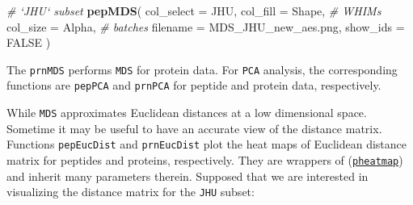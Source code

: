 \documentclass[]{article}
\newenvironment{Shaded}{\begin{snugshade}}{\end{snugshade}}
\newcommand{\CommentTok}[1]{\textcolor[rgb]{0.56,0.35,0.01}{\textit{#1}}}
\newcommand{\DataTypeTok}[1]{\textcolor[rgb]{0.13,0.29,0.53}{#1}}
\newcommand{\KeywordTok}[1]{\textcolor[rgb]{0.13,0.29,0.53}{\textbf{#1}}}
\newcommand{\NormalTok}[1]{#1}
\newcommand{\OtherTok}[1]{\textcolor[rgb]{0.56,0.35,0.01}{#1}}
\begin{document}
\begin{Shaded}
\begin{Highlighting}[]
\CommentTok{# `JHU` subset}
\KeywordTok{pepMDS}\NormalTok{(}
  \DataTypeTok{col_select =}\NormalTok{ JHU,}
  \DataTypeTok{col_fill =}\NormalTok{ Shape, }\CommentTok{# WHIMs  }
  \DataTypeTok{col_size =}\NormalTok{ Alpha, }\CommentTok{# batches}
  \DataTypeTok{filename =}\NormalTok{ MDS_JHU_new_aes.png,}
  \DataTypeTok{show_ids =} \OtherTok{FALSE}
\NormalTok{)}
\end{Highlighting}
\end{Shaded}

The \texttt{prnMDS} performs \texttt{MDS} for protein data. For
\texttt{PCA} analysis, the corresponding functions are \texttt{pepPCA}
and \texttt{prnPCA} for peptide and protein data, respectively.

While \texttt{MDS} approximates Euclidean distances at a low dimensional
space. Sometime it may be useful to have an accurate view of the
distance matrix. Functions \texttt{pepEucDist} and \texttt{prnEucDist}
plot the heat maps of Euclidean distance matrix for peptides and
proteins, respectively. They are wrappers of
(\href{https://cran.r-project.org/web/packages/pheatmap/pheatmap.pdf}{\texttt{pheatmap}})
and inherit many parameters therein. Supposed that we are interested in
visualizing the distance matrix for the \texttt{JHU} subset:
\end{document}
